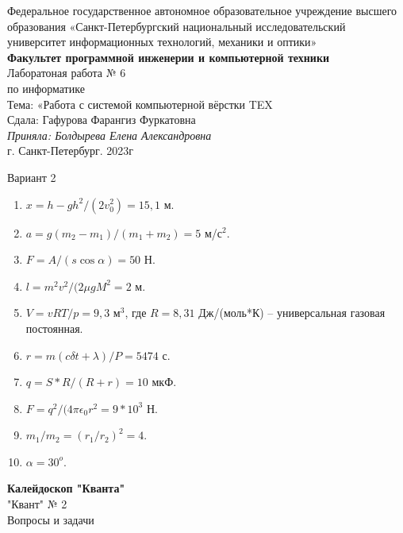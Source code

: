 \documentclass[twocolumn,4pt]{article}
\title{}
\begin{document}
\thispagestyle{empty}
\begin{titlepage}
\centering

\vspace*{\fill} %
{\large Федеральное государственное автономное образовательное учреждение высшего образования «Санкт-Петербургский национальный исследовательский университет информационных технологий, механики и оптики»} \\ [0.5cm]
{\large \textbf{Факультет программной инженерии и компьютерной техники}} \\[1.75cm]
{\Huge Лаборатоная работа № 6} \\ [2mm]
{\Huge по информатике} \\ [1.5mm]
{\Large Тема: «Работа с системой компьютерной вёрстки TEX} \\ [1.5cm]
{\Large Сдала: Гафурова Фарангиз Фуркатовна} \\ [1.5mm]
{\Large \emph{Приняла: Болдырева Елена Александровна}} \\ [3.0cm]
{\large г. Санкт-Петербург. 2023г}

\vfill
\end{titlepage}

\newpage
{}
Вариант 2

\begin{enumerate}
    \item $x=h-gh^2/(2v_0^2)=15,1$ м.
    \item $a=g(m_2-m_1)/(m_1+m_2)=5$ м/с$^2$.
    \item $F=A/(s \cos \alpha)=50$ Н.
    \item $l=m^2v^2/(2 \mu g M^2=2$ м.
    \item $V=vRT/p=9,3$ м$^3$, где $R=8,31$ Дж/(моль*К) -- универсальная газовая постоянная.
    \item $r=m(c \delta t + \lambda)/P=5474$ с.
    \item $q=S*R/(R+r)=10$ мкФ.
    \item $F=q^2/(4 \pi \epsilon_0 r^2=9*10^3$ Н.
    \item $m_1/m_2=(r_1/r_2)^2=4$.
    \item $\alpha = 30^o$. \\
\end{enumerate}

\textbf{Калейдоскоп "Кванта"} \\
"Квант" № 2 \\

Вопросы и задачи 
\end{document}
